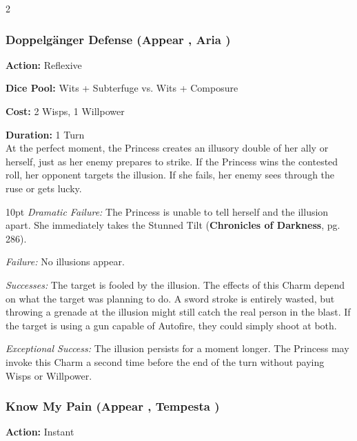 \begin{multicols}{2}
\subsubsection*{Doppelgänger Defense (Appear \textbullet\textbullet\textbullet, Aria \textbullet\textbullet\textbullet)}
\noindent \textbf{Action:} Reflexive

\noindent \textbf{Dice Pool:} Wits + Subterfuge vs. Wits + Composure

\noindent \textbf{Cost:} 2 Wisps, 1 Willpower

\noindent \textbf{Duration:} 1 Turn\\

\noindent At the perfect moment, the Princess creates an illusory double of her ally or herself, just as her enemy prepares to strike. If the Princess wins the contested roll, her opponent targets the illusion. If she fails, her enemy sees through the ruse or gets lucky.

\begin{myindentpar}{10pt}     \emph{Dramatic Failure:} The Princess is unable to tell herself and the illusion apart. She immediately takes the Stunned Tilt (\textbf{Chronicles of Darkness}, pg. 286).

    \emph{Failure:} No illusions appear.

    \emph{Successes:}  The target is fooled by the illusion. The effects of this Charm depend on what the target was planning to do. A sword stroke is entirely wasted, but throwing a grenade at the illusion might still catch the real person in the blast. If the target is using a gun capable of Autofire, they could simply shoot at both.

    \emph{Exceptional Success:} The illusion persists for a moment longer. The Princess may invoke this Charm a second time before the end of the turn without paying Wisps or Willpower. \end{myindentpar}




\subsubsection*{Know My Pain (Appear \textbullet\textbullet\textbullet, Tempesta \textbullet\textbullet)}
\noindent \textbf{Action:} Instant


\end{multicols}
